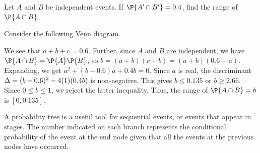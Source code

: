\begin{sample}
    Let $A$ and $B$ be independent events. If $\P{A' \cap B'} = 0.4$, find the range of $\P{A \cap B}$.
\end{sample}
\begin{sampans}
    Consider the following Venn diagram.
    \begin{figure}[H]
        \centering
        \caption{}
    \end{figure}
    We see that $a + b + c = 0.6$. Further, since $A$ and $B$ are independent, we have $\P{A \cap B} = \P{A} \P{B}$, so $b = (a+b)(c+b) = (a+b)(0.6 - a)$. Expanding, we get $a^2 + (b - 0.6)a + 0.4 b = 0$. Since $a$ is real, the discriminant $\Delta = (b-0.6)^2 - 4(1)(0.4b)$ is non-negative. This gives $b \leq 0.135$ or $b \geq 2.66$. Since $0 \leq b \leq 1$, we reject the latter inequality. Thus, the range of $\P{A \cap B} = b$ is $[0, 0.135]$.
\end{sampans}

\begin{recipe}
    A probability tree is a useful tool for sequential events, or events that appear in stages. The number indicated on each branch represents the conditional probability of the event at the end node given that all the events at the previous nodes have occurred.
\end{recipe}

